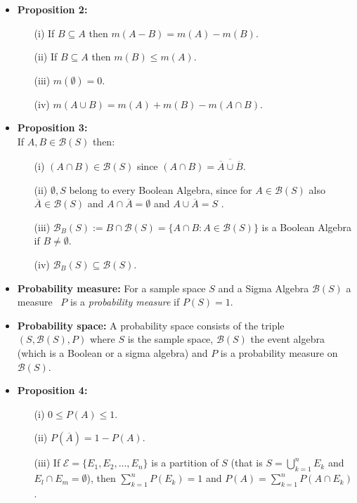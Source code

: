 \documentclass[11pt]{article}
\begin{document}
\begin{itemize}
\item {\bf Proposition 2:} 
\begin{itemize}
\item[(i)] If $B\subseteq A$ then $m(A-B) = m(A) - m(B)$.
\item[(ii)] If $B\subseteq A$ then $m(B) \le m(A)$.
\item[(iii)] $m(\emptyset) =0$.
\item[(iv)] $m(A \cup B) = m(A) + m(B) - m(A\cap B)$.
\end{itemize}

\item {\bf Proposition 3:}\\
If $A,B \in \mathcal{B}(S)$ then:
\begin{itemize}
\item[(i)] $ (A \cap B) \in \mathcal{B}(S)$ since $ (A \cap B) = \overline{\overline{A} \cup \overline{B}}$.
\item[(ii)] $\emptyset, S$ belong to every Boolean Algebra, since for $A \in \mathcal{B}(S)$ also $\overline{A} \in \mathcal{B}(S)$ and $A \cap \overline{A} = \emptyset$ and $A\cup \overline{A} = S$ .
\item[(iii)] $\mathcal{B}_B(S) := B \cap \mathcal{B}(S) = \{A \cap B: A \in \mathcal{B}(S)\}$ is a Boolean Algebra if $B\ne \emptyset$.
\item[(iv)] $\mathcal{B}_B(S) \subseteq \mathcal{B}(S)$. 
\end{itemize}


\item {\bf Probability measure:} For a sample space $S$ and a Sigma Algebra $\mathcal{B}(S)$ a measure \, $P$ is a {\it probability measure} if $P(S)=1$.

\item {\bf Probability space:} A probability space consists of the triple $(S,\mathcal{B}(S), P)$ where $S$ is the sample space, $\mathcal{B}(S)$ the event algebra (which is a Boolean or a sigma algebra) and $P$ is a  probability measure on $\mathcal{B}(S)$. 

\item {\bf Proposition 4:} 
\begin{itemize}
\item[(i)] $0 \le P(A) \le 1$.
\item[(ii)] $P(\overline{A}) = 1-P(A)$.
\item[(iii)] If $\mathcal{E}= \{E_1, E_2, \dots, E_n\}$ is a partition of $S$ (that is $S= \bigcup_{k=1}^n E_k$ and $E_l \cap E_m = \emptyset$), then \quad $\sum_{k=1}^n P(E_k) = 1$ \quad and \quad $P(A)=\sum_{k=1}^n P(A\cap E_k)$.
\end{itemize}


\end{itemize}
\end{document}

